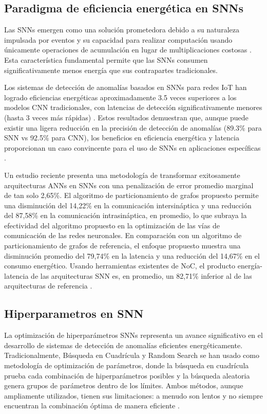 \subsection{Paradigma de eficiencia energética en SNNs}

Las SNNs emergen como una solución prometedora debido a su naturaleza impulsada por eventos y su capacidad para realizar computación usando únicamente operaciones de acumulación en lugar de multiplicaciones costosas \cite{jang_bisnn_2021}. Esta característica fundamental permite que las SNNs consumen significativamente menos energía que sus contrapartes tradicionales.

Los sistemas de detección de anomalías basados en SNNs para redes IoT han logrado eficiencias energéticas aproximadamente 3.5 veces superiores a los modelos CNN tradicionales, con latencias de detección significativamente menores (hasta 3 veces más rápidas) \cite{maddula_ai-driven_2024}. Estos resultados demuestran que, aunque puede existir una ligera reducción en la precisión de detección de anomalías (89.3\% para SNN vs 92.5\% para CNN), los beneficios en eficiencia energética y latencia proporcionan un caso convincente para el uso de SNNs en aplicaciones específicas \cite{maddula_ai-driven_2024}.

Un estudio reciente presenta una metodología de transformar exitosamente arquitecturas ANNs en SNNs con una penalización de error promedio marginal de tan solo 2,65\%. El algoritmo de particionamiento de grafos propuesto permite una disminución del 14,22\% en la comunicación intersináptica y una reducción del 87,58\% en la comunicación intrasináptica, en promedio, lo que subraya la efectividad del algoritmo propuesto en la optimización de las vías de comunicación de las redes neuronales. En comparación con un algoritmo de particionamiento de grafos de referencia, el enfoque propuesto muestra una disminución promedio del 79,74\% en la latencia y una reducción del 14,67\% en el consumo energético. Usando herramientas existentes de NoC, el producto energía-latencia de las arquitecturas SNN es, en promedio, un 82,71\% inferior al de las arquitecturas de referencia \cite{islam_benchmarking_2024}.

\subsection{Hiperparametros en SNN}

La optimización de hiperparámetros SNNs representa un avance significativo en el desarrollo de sistemas de detección de anomalías eficientes energéticamente. Tradicionalmente, Búsqueda en Cuadrícula y Random Search se han usado como metodología de optimización de parámetros, donde la búsqueda en cuadrícula prueba cada combinación de hiperparámetros posibles y la búsqueda aleatoria genera grupos de parámetros dentro de los límites. Ambos métodos, aunque ampliamente utilizados, tienen sus limitaciones: a menudo son lentos y no siempre encuentran la combinación óptima de manera eficiente \cite{kaushik_optuna_2024}. 

